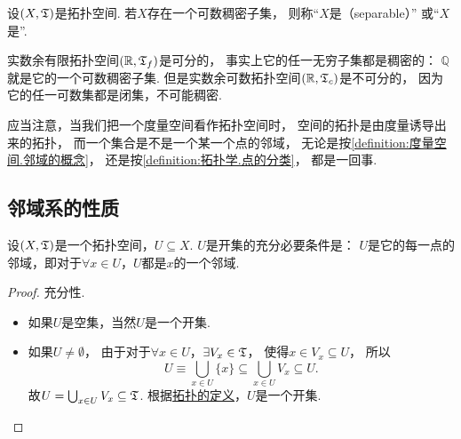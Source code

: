 \begin{definition}
设\((X,\mathfrak T)\)是拓扑空间.
若\(X\)存在一个可数稠密子集，
则称“\(X\)是（separable）”
或“\(X\)是”.
\end{definition}

\begin{example}
实数余有限拓扑空间\((\mathbb{R},\mathfrak T_f)\)是可分的，
事实上它的任一无穷子集都是稠密的：
\(\mathbb{Q}\)就是它的一个可数稠密子集.
但是实数余可数拓扑空间\((\mathbb{R},\mathfrak T_c)\)是不可分的，
因为它的任一可数集都是闭集，不可能稠密.
\end{example}

\begin{remark}
应当注意，当我们把一个度量空间看作拓扑空间时，
空间的拓扑是由度量诱导出来的拓扑，
而一个集合是不是一个某一个点的邻域，
无论是按\cref{definition:度量空间.邻域的概念}，
还是按\cref{definition:拓扑学.点的分类}，
都是一回事.
\end{remark}

\subsection{邻域系的性质}
\begin{theorem}\label{theorem:拓扑学.成为开集的充分必要条件1}
设\((X,\mathfrak T)\)是一个拓扑空间，\(U \subseteq X\).
\(U\)是开集的充分必要条件是：
\(U\)是它的每一点的邻域，即对于\(\forall x \in U\)，\(U\)都是\(x\)的一个邻域.
\begin{proof}
充分性.
\begin{itemize}
	\item 如果\(U\)是空集，当然\(U\)是一个开集.

	\item 如果\(U\neq\emptyset\)，
	由于对于\(\forall x \in U\)，\(\exists V_x \in \mathfrak T\)，
	使得\(x \in V_x \subseteq U\)，
	所以\[
	U \equiv \bigcup_{x \in U} \{ x \}
	\subseteq \bigcup_{x \in U} V_x
	\subseteq U.
	\]
	故\(U = \bigcup_{x \in U} V_x \subseteq \mathfrak T\).
	根据\hyperref[definition:拓扑学.开集公理定义的拓扑空间]{拓扑的定义}，\(U\)是一个开集.
	\qedhere
\end{itemize}
\end{proof}
\end{theorem}

